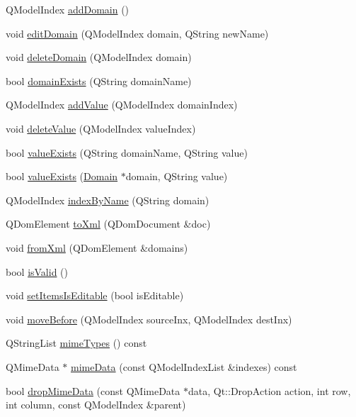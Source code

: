 \begin{DoxyCompactItemize}
\item 
QModelIndex \hyperlink{class_domain_model_a75b45483c795dddd91568e7844e9ee83}{addDomain} ()
\item 
void \hyperlink{class_domain_model_ae1f04fa1cc292b5534075f3e301664aa}{editDomain} (QModelIndex domain, QString newName)
\item 
void \hyperlink{class_domain_model_aa592b6841ac4a946f9e65c622b324efd}{deleteDomain} (QModelIndex domain)
\item 
bool \hyperlink{class_domain_model_a96b1a8f93cfb4ced4dc280eab3940f27}{domainExists} (QString domainName)
\item 
QModelIndex \hyperlink{class_domain_model_ab4547cf7ef7f375671d9ca37b6c0720b}{addValue} (QModelIndex domainIndex)
\item 
void \hyperlink{class_domain_model_af1433c75de73ddb81e556793d11f9e1d}{deleteValue} (QModelIndex valueIndex)
\item 
bool \hyperlink{class_domain_model_a84cd3e480bce10f08ebc0d41826a98d9}{valueExists} (QString domainName, QString value)
\item 
bool \hyperlink{class_domain_model_a3b68019a9add9363920012c15fa8e5b9}{valueExists} (\hyperlink{class_domain}{Domain} $\ast$domain, QString value)
\item 
QModelIndex \hyperlink{class_domain_model_ab6e0399356a6c9046b91fe37bdb90a9f}{indexByName} (QString domain)
\item 
QDomElement \hyperlink{class_domain_model_a31a98493ea55e4cc430b6623c3ebfcdf}{toXml} (QDomDocument \&doc)
\item 
void \hyperlink{class_domain_model_a1d23cde23fc08a0c7ad095c3fda6ac7d}{fromXml} (QDomElement \&domains)
\item 
bool \hyperlink{class_domain_model_a941c1e4edffffb3e4441bde9aa91a560}{isValid} ()
\item 
void \hyperlink{class_domain_model_a77a06ec53eaf555cef2741cee969b591}{setItemsIsEditable} (bool isEditable)
\item 
void \hyperlink{class_domain_model_af152b5c038dc4ac3c564e0238e4eb62d}{moveBefore} (QModelIndex sourceInx, QModelIndex destInx)
\item 
QStringList \hyperlink{class_domain_model_ab9218e6d390c8617efb7b7b507fa1631}{mimeTypes} () const 
\item 
QMimeData $\ast$ \hyperlink{class_domain_model_a387519bb071d4a1f3dcead2cde20bc07}{mimeData} (const QModelIndexList \&indexes) const 
\item 
bool \hyperlink{class_domain_model_a21665633939b2d605aa0749f33957b4d}{dropMimeData} (const QMimeData $\ast$data, Qt::DropAction action, int row, int column, const QModelIndex \&parent)
\end{DoxyCompactItemize}


